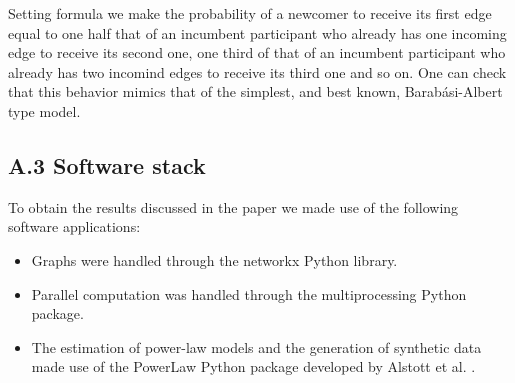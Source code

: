 Setting formula we make the probability of a newcomer to receive its first edge equal to one half that of an incumbent participant who already has one incoming edge to receive its second one, one third of that of an incumbent participant who already has two incomind edges to receive its third one and so on. One can check that this behavior mimics that of the simplest, and best known, Barabási-Albert type model. 

\subsection*{A.3 Software stack}

To obtain the results discussed in the paper we made use of the following software applications:
\begin{itemize}
\item Graphs were handled through the networkx Python library.
\item Parallel computation was handled through the multiprocessing Python package. 
\item The estimation of power-law models and the generation of synthetic data made use of the PowerLaw Python package developed by Alstott et al. \cite{alstott2014powerlaw}.
\end{itemize}
